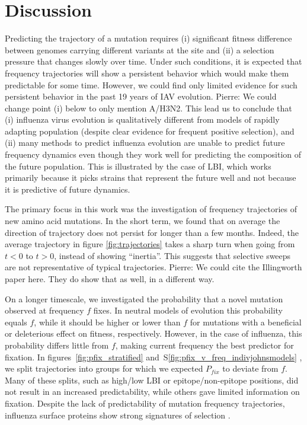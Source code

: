 \documentclass[reprint,amsmath,amssymb,superscriptaddress,showpacs,rmp]{revtex4-1}
\newcommand{\pierre}[1]{{\color{red}Pierre: #1}}
\newcommand{\sref}[1]{S\ref{#1}}
\begin{document}

\section*{Discussion} %
\label{sec:discussion}

Predicting the trajectory of a mutation requires (i) significant fitness difference between genomes carrying different variants at the site and (ii) a selection pressure that changes slowly over time.
Under such conditions, it is expected that frequency trajectories will show a persistent behavior which would make them predictable for some time.
However, we could find only limited evidence for such persistent behavior in the past 19 years of IAV evolution.
\pierre{We could change point (i) below to only mention A/H3N2. }
This lead us to conclude that (i) influenza virus evolution is qualitatively different from models of rapidly adapting population (despite clear evidence for frequent positive selection), and (ii) many methods to predict influenza evolution are unable to predict future frequency dynamics even though they work well for predicting the composition of the future population. 
This is illustrated by the case of LBI, which works primarily because it picks strains that represent the future well and not because it is predictive of future dynamics.

The primary focus in this work was the investigation of frequency trajectories of new amino acid mutations.
In the short term, we found that on average the direction of trajectory does not persist for longer than a few months.
Indeed, the average trajectory in figure \ref{fig:trajectories} takes a sharp turn when going from $t<0$ to $t>0$, instead of showing ``inertia''.
This suggests that selective sweeps are not representative of typical trajectories. \pierre{We could cite the Illingworth paper here. They do show that as well, in a different way.}

On a longer timescale, we investigated the probability that a novel mutation observed at frequency $f$ fixes.
In neutral models of evolution this probability equals $f$, while it should be higher or lower than $f$ for mutations with a beneficial or deleterious effect on fitness, respectively.
However, in the case of influenza, this probability differs little from $f$, making current frequency the best predictor for fixation.
In figures~\ref{fig:pfix_stratified} and~\sref{fig:pfix_v_freq_indivjohnsmodels} , we split trajectories into groups for which we expected $P_{fix}$ to deviate from $f$.
Many of these splits, such as high/low LBI or epitope/non-epitope positions, did not result in an increased predictability, while others gave limited information on fixation.
Despite the lack of predictability of mutation frequency trajectories, influenza surface proteins show strong signatures of selection \citep{bhatt_genomic_2011,strelkowa_clonal_2012}.
\end{document}
